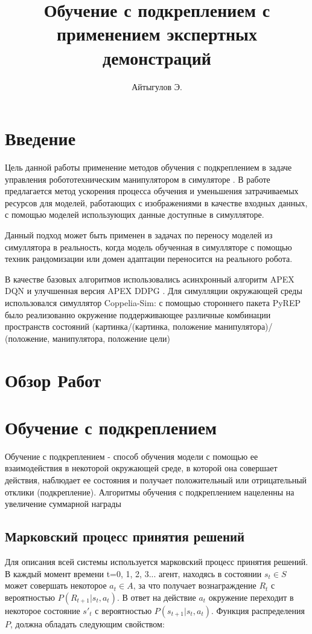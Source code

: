 \documentclass{mipt-thesis-bs}
\title{Обучение с подкреплением с применением экспертных демонстраций}
\author{Айтыгулов Э.}
\begin{document}
\frontmatter
\titlecontents

\chapter{Введение}

Цель данной работы применение методов обучения с подкреплением в задаче управления робототехническим манипулятором в симуляторе \cite{}. В работе предлагается метод ускорения процесса обучения и уменьшения затрачиваемых ресурсов для моделей, работающих с изображениями в качестве входных данных, с помощью моделей использующих данные доступные в симулляторе. 

Данный подход может быть применен в задачах по переносу моделей из симуллятора в реальность, когда модель обученная в симулляторе с помощью техник рандомизации или домен адаптации переносится на реального робота.

В качестве базовых алгоритмов использовались асинхронный алгоритм APEX DQN \cite{} и улучшенная версия APEX DDPG  \cite{}. Для симулляции окружающей среды использовался симуллятор Coppelia-Sim: с помощью стороннего пакета PyREP было реализованно окружение поддерживающее различные комбинации пространств состояний (картинка/(картинка, положение манипулятора)/ (положение, манипулятора, положение цели)

\chapter{Обзор Работ}



\mainmatter


\chapter{Обучение с подкреплением}

Обучение с подкреплением - способ обучения модели с помощью ее взаимодействия в некоторой окружающей среде, в которой она совершает действия, наблюдает ее состояния и получает положительный или отрицательный отклики (подкрепление). Алгоритмы обучения с подкреплением нацеленны на увеличение суммарной награды  
\section{Марковский процесс принятия решений}
Для описания всей системы используется марковский процесс принятия решений. В каждый момент времени t=0, 1, 2, 3... агент, находясь в состоянии $s_t\in S$ может совершать некоторое $a_t\in A$, за что получает вознаграждение $R_t$ с вероятностью $P(R_{t+1}|s_t,a_t)$. В ответ на действие $a_t$ окружение переходит в некоторое состояние $s'_t$ с вероятностью $P(s_{t+1}|s_t,a_t)$. Функция распределения $P$, должна обладать следующим свойством:
\end{document}

